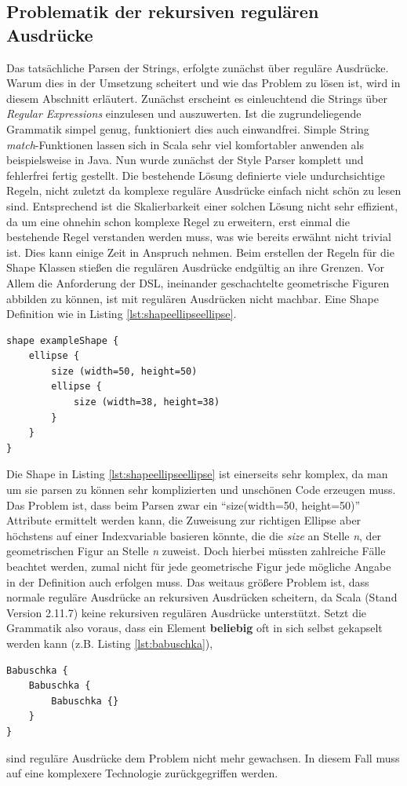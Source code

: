 \subsection{Problematik der rekursiven regulären Ausdrücke}
Das tatsächliche Parsen der Strings, erfolgte zunächst über reguläre Ausdrücke. Warum dies in der Umsetzung scheitert und wie das Problem zu lösen ist, wird in diesem Abschnitt erläutert. Zunächst erscheint es einleuchtend die Strings über \textit{Regular Expressions} einzulesen und auszuwerten. Ist die zugrundeliegende Grammatik simpel genug, funktioniert dies auch einwandfrei. Simple String \textit{match}-Funktionen lassen sich in Scala sehr viel komfortabler anwenden als beispielsweise in Java. Nun wurde zunächst der Style Parser komplett und fehlerfrei fertig gestellt. Die bestehende Lösung definierte viele undurchsichtige Regeln, nicht zuletzt da komplexe reguläre Ausdrücke einfach nicht schön zu lesen sind. Entsprechend ist die Skalierbarkeit einer solchen Lösung nicht sehr effizient, da um eine ohnehin schon komplexe Regel zu erweitern, erst einmal die bestehende Regel verstanden werden muss, was wie bereits erwähnt nicht trivial ist. Dies kann einige Zeit in Anspruch nehmen. Beim erstellen der Regeln für die Shape Klassen stießen die regulären Ausdrücke endgültig an ihre Grenzen. Vor Allem die Anforderung der DSL, ineinander geschachtelte geometrische Figuren abbilden zu können, ist mit regulären Ausdrücken nicht machbar. Eine Shape Definition wie in Listing \ref{lst:shapeellipseellipse}.
\begin{lstlisting}[style=spray, caption = {Beispielhafte Shapedefinition}, label = {lst:shapeellipseellipse}]
shape exampleShape {
    ellipse {
        size (width=50, height=50)
        ellipse {
            size (width=38, height=38)
        }
    }
}
\end{lstlisting} Die Shape in Listing \ref{lst:shapeellipseellipse} ist einerseits sehr komplex, da man um sie parsen zu können sehr komplizierten und unschönen Code erzeugen muss. Das Problem ist, dass beim Parsen zwar ein "`size(width=50, height=50)"' Attribute ermittelt werden kann, die Zuweisung zur richtigen Ellipse aber höchstens auf einer Indexvariable basieren könnte, die die \textit{size} an Stelle \textit{n}, der geometrischen Figur an Stelle \textit{n} zuweist. Doch hierbei müssten zahlreiche Fälle beachtet werden, zumal nicht für jede geometrische Figur jede mögliche Angabe in der Definition auch erfolgen muss. Das weitaus größere Problem ist,
dass normale reguläre Ausdrücke an rekursiven Ausdrücken scheitern, da Scala (Stand Version 2.11.7) keine rekursiven regulären Ausdrücke unterstützt. Setzt die Grammatik also voraus, dass ein Element \textbf{beliebig} oft in sich selbst gekapselt werden kann (z.B. Listing \ref{lst:babuschka}),
\begin{lstlisting}[style=scala, caption = {Beispiel für eine rekursive Grammatik anhand der russischen \textit{Babuschka} Puppen}, label = {lst:babuschka}]
Babuschka {
    Babuschka {
        Babuschka {}
    }
}
\end{lstlisting}sind reguläre Ausdrücke dem Problem nicht mehr gewachsen.
In diesem Fall muss auf eine komplexere Technologie zurückgegriffen werden.

